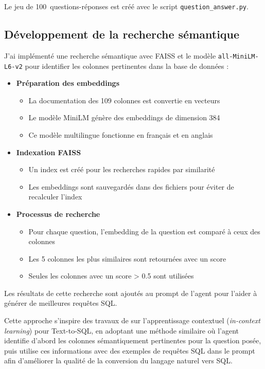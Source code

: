 \documentclass[a4paper,11pt]{article}
\begin{document}
Le jeu de 100~questions-réponses est créé avec le script \texttt{question\_answer.py}.


\subsection{Développement de la recherche sémantique}

J'ai implémenté une recherche sémantique avec FAISS et le modèle \texttt{all-MiniLM-L6-v2} pour identifier les colonnes pertinentes dans la base de données :

\begin{itemize}
    \item \textbf{Préparation des embeddings}
    \begin{itemize}
        \item La documentation des 109 colonnes est convertie en vecteurs
        \item Le modèle MiniLM génère des embeddings de dimension 384
        \item Ce modèle multilingue fonctionne en français et en anglais
    \end{itemize}
    
    \item \textbf{Indexation FAISS}
    \begin{itemize}
        \item Un index est créé pour les recherches rapides par similarité
        \item Les embeddings sont sauvegardés dans des fichiers pour éviter de recalculer l'index
    \end{itemize}
    
    \item \textbf{Processus de recherche}
    \begin{itemize}
        \item Pour chaque question, l'embedding de la question est comparé à ceux des colonnes
        \item Les 5 colonnes les plus similaires sont retournées avec un score
        \item Seules les colonnes avec un score > 0.5 sont utilisées
    \end{itemize}
\end{itemize}

Les résultats de cette recherche sont ajoutés au prompt de l'agent pour l'aider à générer de meilleures requêtes SQL.

Cette approche s'inspire des travaux de \citet{gao2023text} sur l'apprentissage contextuel (\textit{in-context learning}) pour Text-to-SQL, en adoptant une méthode similaire où l'agent identifie d'abord les colonnes sémantiquement pertinentes pour la question posée, puis utilise ces informations avec des exemples de requêtes SQL dans le prompt afin d'améliorer la qualité de la conversion du langage naturel vers SQL.
\end{document}
